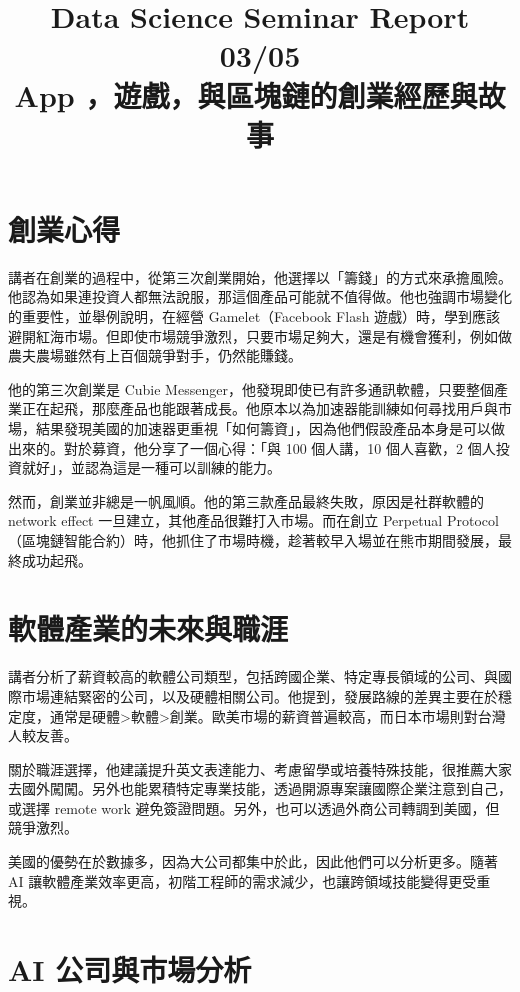 \documentclass{homework}
\begin{document}
\title{Data Science Seminar Report 03/05 \\ App ，遊戲，與區塊鏈的創業經歷與故事}
\author{\chineseName \masterStudentID}
\date{}
\maketitle

\section*{創業心得}

講者在創業的過程中，從第三次創業開始，他選擇以「籌錢」的方式來承擔風險。他認為如果連投資人都無法說服，那這個產品可能就不值得做。他也強調市場變化的重要性，並舉例說明，在經營 Gamelet（Facebook Flash 遊戲）時，學到應該避開紅海市場。但即使市場競爭激烈，只要市場足夠大，還是有機會獲利，例如做農夫農場雖然有上百個競爭對手，仍然能賺錢。

他的第三次創業是 Cubie Messenger，他發現即使已有許多通訊軟體，只要整個產業正在起飛，那麼產品也能跟著成長。他原本以為加速器能訓練如何尋找用戶與市場，結果發現美國的加速器更重視「如何籌資」，因為他們假設產品本身是可以做出來的。對於募資，他分享了一個心得：「與 100 個人講，10 個人喜歡，2 個人投資就好」，並認為這是一種可以訓練的能力。

然而，創業並非總是一帆風順。他的第三款產品最終失敗，原因是社群軟體的 network effect 一旦建立，其他產品很難打入市場。而在創立 Perpetual Protocol（區塊鏈智能合約）時，他抓住了市場時機，趁著較早入場並在熊市期間發展，最終成功起飛。

\section*{軟體產業的未來與職涯}

講者分析了薪資較高的軟體公司類型，包括跨國企業、特定專長領域的公司、與國際市場連結緊密的公司，以及硬體相關公司。他提到，發展路線的差異主要在於穩定度，通常是硬體>軟體>創業。歐美市場的薪資普遍較高，而日本市場則對台灣人較友善。

關於職涯選擇，他建議提升英文表達能力、考慮留學或培養特殊技能，很推薦大家去國外闖闖。另外也能累積特定專業技能，透過開源專案讓國際企業注意到自己，或選擇 remote work 避免簽證問題。另外，也可以透過外商公司轉調到美國，但競爭激烈。

美國的優勢在於數據多，因為大公司都集中於此，因此他們可以分析更多。隨著 AI 讓軟體產業效率更高，初階工程師的需求減少，也讓跨領域技能變得更受重視。

\section*{AI 公司與市場分析}
\end{document}
